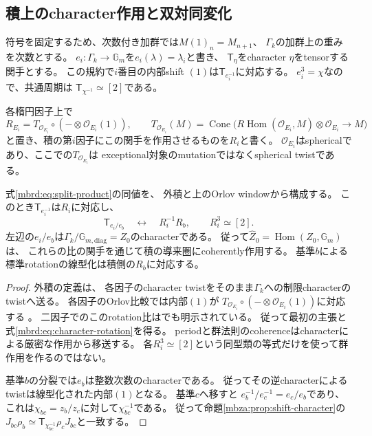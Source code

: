 \subsection{積上のcharacter作用と双対同変化}

符号を固定するため、次数付き加群では$M(1)_n=M_{n+1}$、
$\Gamma_k$の加群上の重みを次数とする。
$e_i:\Gamma_k\to\mathbb G_m$を$e_i(\lambda)=\lambda_i$と書き、
$\mathsf T_\eta$をcharacter $\eta$をtensorする関手とする。
この規約で$i$番目の内部shift $(1)$は$\mathsf T_{e_i^{-1}}$に対応する。
$e_i^3=\chi$なので、共通周期は
$\mathsf T_{\chi^{-1}}\simeq[2]$である。

各楕円因子上で
\[
 R_{E_i}=T_{\mathcal O_{E_i}}\circ
       (-\otimes\mathcal O_{E_i}(1)),\qquad
 T_{\mathcal O_{E_i}}(M)=
 \operatorname{Cone}\bigl(
 R\operatorname{Hom}(\mathcal O_{E_i},M)\otimes\mathcal O_{E_i}\to M
 \bigr)
\]
と置き、積の第$i$因子にこの関手を作用させるものを$R_i$と書く。
$\mathcal O_{E_i}$はsphericalであり、ここでの$T_{\mathcal O_{E_i}}$は
exceptional対象のmutationではなくspherical twistである。

\begin{proposition}[characterと因子rotation]
\label{mbrd:prop:factor-rotations}
式\eqref{mbrd:eq:split-product}の同値を、
外積と上のOrlov windowから構成する。
このとき$\mathsf T_{e_i^{-1}}$は$R_i$に対応し、
\begin{equation}\label{mbrd:eq:character-rotation}
 \mathsf T_{e_i/e_b}\quad\longleftrightarrow\quad R_i^{-1}R_b,
 \qquad R_i^3\simeq[2].
\end{equation}
左辺の$e_i/e_b$は$\Gamma_k/\mathbb G_{m,\mathrm{diag}}=Z_0$のcharacterである。
従って$\widehat Z_0=\operatorname{Hom}(Z_0,\mathbb G_m)$は、
これらの比の関手を通じて積の導来圏にcoherently作用する。
基準$b$による標準rotationの線型化は積側の$R_b$に対応する。
\end{proposition}
\begin{proof}
外積の定義\cite[Definition~3.51]{NFBFKKernels}は、
各因子のcharacter twistをそのまま$\Gamma_k$への制限characterのtwistへ送る。
各因子のOrlov比較では内部$(1)$が
$T_{\mathcal O_{E_i}}\circ(-\otimes\mathcal O_{E_i}(1))$に対応する
\cite[Theorem~6.13]{NFBFKKernels}。
二因子でのこのrotation比は\cite[Example~4.12]{MBRDBFKFurther}でも明示されている。
従って最初の主張と式\eqref{mbrd:eq:character-rotation}を得る。
periodと群法則のcoherenceはcharacterによる厳密な作用から移送する。
各$R_i^3\simeq[2]$という同型類の等式だけを使って群作用を作るのではない。

基準$b$の分裂では$e_b$は整数次数のcharacterである。
従ってその逆characterによるtwistは線型化された内部$(1)$となる。
基準$c$へ移すと
$e_b^{-1}/e_c^{-1}=e_c/e_b$であり、
これは$\chi_{bc}=z_b/z_c$に対して$\chi_{bc}^{-1}$である。
従って命題\ref{mbza:prop:shift-character}の
$J_{bc}\rho_b\simeq\mathsf T_{\chi_{bc}^{-1}}\rho_cJ_{bc}$と一致する。
\end{proof}

